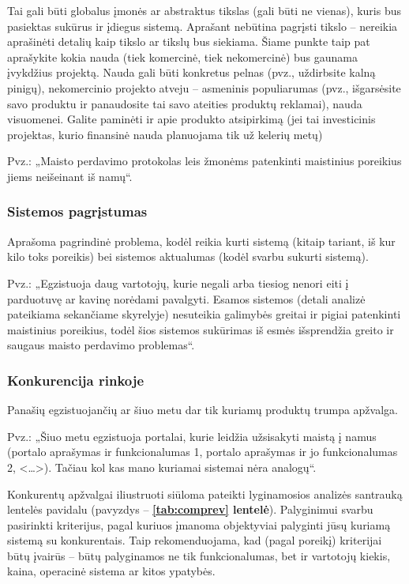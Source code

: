 \documentclass{ktuthesis}
\begin{document}
  Tai gali būti globalus įmonės ar abstraktus tikslas (gali būti ne vienas), kuris bus pasiektas sukūrus ir įdiegus sistemą. Aprašant nebūtina pagrįsti tikslo – nereikia aprašinėti detalių kaip tikslo ar tikslų bus siekiama. Šiame punkte taip pat aprašykite kokia nauda (tiek komercinė, tiek nekomercinė) bus gaunama įvykdžius projektą. Nauda gali būti konkretus pelnas (pvz., uždirbsite kalną pinigų), nekomercinio projekto atveju – asmeninis populiarumas (pvz., išgarsėsite savo produktu ir panaudosite tai savo ateities produktų reklamai), nauda visuomenei. Galite paminėti ir apie produkto atsipirkimą (jei tai investicinis projektas, kurio finansinė nauda planuojama tik už kelerių metų)

  Pvz.: „Maisto perdavimo protokolas leis žmonėms patenkinti maistinius poreikius jiems neišeinant iš namų“.

  \subsubsection{Sistemos pagrįstumas}

  Aprašoma pagrindinė problema, kodėl reikia kurti sistemą (kitaip tariant, iš kur kilo toks poreikis) bei sistemos aktualumas (kodėl svarbu sukurti sistemą).

  Pvz.: „Egzistuoja daug vartotojų, kurie negali arba tiesiog nenori eiti į parduotuvę ar kavinę norėdami pavalgyti. Esamos sistemos (detali analizė pateikiama sekančiame skyrelyje) nesuteikia galimybės greitai ir pigiai patenkinti maistinius poreikius, todėl šios sistemos sukūrimas iš esmės išsprendžia greito ir saugaus maisto perdavimo problemas“.

  \subsubsection{Konkurencija rinkoje}

  Panašių egzistuojančių ar šiuo metu dar tik kuriamų produktų trumpa apžvalga.

  Pvz.: „Šiuo metu egzistuoja portalai, kurie leidžia užsisakyti maistą į namus (portalo aprašymas ir funkcionalumas 1, portalo aprašymas ir jo funkcionalumas 2, <\dots>). Tačiau kol kas mano kuriamai sistemai nėra analogų“.

  Konkurentų apžvalgai iliustruoti siūloma pateikti lyginamosios analizės santrauką lentelės pavidalu (pavyzdys – \textbf{\ref{tab:comprev} lentelė}). Palyginimui svarbu pasirinkti kriterijus, pagal kuriuos įmanoma objektyviai palyginti jūsų kuriamą sistemą su konkurentais. Taip rekomenduojama, kad (pagal poreikį) kriterijai būtų įvairūs – būtų palyginamos ne tik funkcionalumas, bet ir vartotojų kiekis, kaina, operacinė sistema ar kitos ypatybės.
\end{document}
